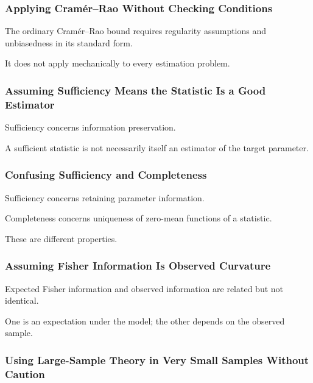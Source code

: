 \subsubsection{Applying Cramér--Rao Without Checking Conditions}

The ordinary Cramér--Rao bound requires regularity assumptions and
unbiasedness in its standard form.

It does not apply mechanically to every estimation problem.

\subsubsection{Assuming Sufficiency Means the Statistic Is a Good Estimator}

Sufficiency concerns information preservation.

A sufficient statistic is not necessarily itself an estimator of the
target parameter.

\subsubsection{Confusing Sufficiency and Completeness}

Sufficiency concerns retaining parameter information.

Completeness concerns uniqueness of zero-mean functions of a statistic.

These are different properties.

\subsubsection{Assuming Fisher Information Is Observed Curvature}

Expected Fisher information and observed information are related but not
identical.

One is an expectation under the model; the other depends on the observed
sample.

\subsubsection{Using Large-Sample Theory in Very Small Samples Without Caution}


